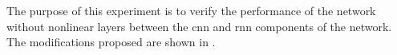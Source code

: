 
The purpose of this experiment is to verify the performance
of the network without nonlinear layers between the
\gls{cnn} and \gls{rnn} components of the network. The
modifications proposed are shown in .


